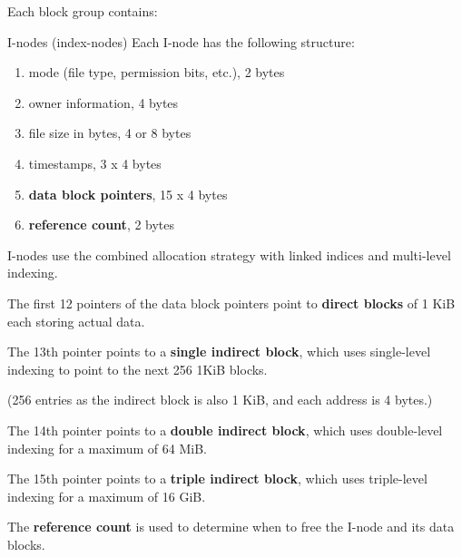 Each block group contains:
\begin{enumerate}
\end{enumerate}

\begin{defn}{I-nodes (index-nodes)}
    Each I-node has the following structure:
    \begin{enumerate}
        \item mode (file type, permission bits, etc.), 2 bytes
        \item owner information, 4 bytes
        \item file size in bytes, 4 or 8 bytes
        \item timestamps, 3 x 4 bytes
        \item \textbf{data block pointers}, 15 x 4 bytes
        \item \textbf{reference count}, 2 bytes
    \end{enumerate}

    I-nodes use the combined allocation strategy with linked indices and multi-level indexing.

    The first 12 pointers of the data block pointers point to \textbf{direct blocks} of 1 KiB each storing actual data.

    The 13th pointer points to a \textbf{single indirect block}, which uses single-level indexing to point to the next 256 1KiB blocks.

    (256 entries as the indirect block is also 1 KiB, and each address is 4 bytes.)

    The 14th pointer points to a \textbf{double indirect block}, which uses double-level indexing for a maximum of 64 MiB.
    
    The 15th pointer points to a \textbf{triple indirect block}, which uses triple-level indexing for a maximum of 16 GiB.

    The \textbf{reference count} is used to determine when to free the I-node and its data blocks.
\end{defn}

